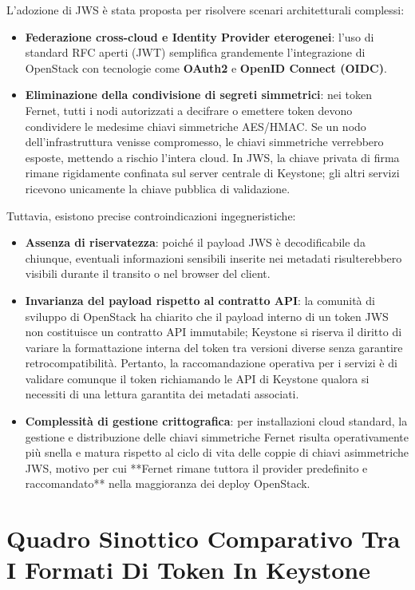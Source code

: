 \documentclass[11pt, a4paper]{article}
\begin{document}
L'adozione di JWS è stata proposta per risolvere scenari architetturali complessi:
\begin{itemize}[noitemsep]
    \item \textbf{Federazione cross-cloud e Identity Provider eterogenei}: l'uso di standard RFC aperti (JWT) semplifica grandemente l'integrazione di OpenStack con tecnologie come \textbf{OAuth2} e \textbf{OpenID Connect (OIDC)}.
    \item \textbf{Eliminazione della condivisione di segreti simmetrici}: nei token Fernet, tutti i nodi autorizzati a decifrare o emettere token devono condividere le medesime chiavi simmetriche AES/HMAC. Se un nodo dell'infrastruttura venisse compromesso, le chiavi simmetriche verrebbero esposte, mettendo a rischio l'intera cloud. In JWS, la chiave privata di firma rimane rigidamente confinata sul server centrale di Keystone; gli altri servizi ricevono unicamente la chiave pubblica di validazione.
\end{itemize}

Tuttavia, esistono precise controindicazioni ingegneristiche:
\begin{itemize}
    \item \textbf{Assenza di riservatezza}: poiché il payload JWS è decodificabile da chiunque, eventuali informazioni sensibili inserite nei metadati risulterebbero visibili durante il transito o nel browser del client.
    \item \textbf{Invarianza del payload rispetto al contratto API}: la comunità di sviluppo di OpenStack ha chiarito che il payload interno di un token JWS non costituisce un contratto API immutabile; Keystone si riserva il diritto di variare la formattazione interna del token tra versioni diverse senza garantire retrocompatibilità. Pertanto, la raccomandazione operativa per i servizi è di validare comunque il token richiamando le API di Keystone qualora si necessiti di una lettura garantita dei metadati associati.
    \item \textbf{Complessità di gestione crittografica}: per installazioni cloud standard, la gestione e distribuzione delle chiavi simmetriche Fernet risulta operativamente più snella e matura rispetto al ciclo di vita delle coppie di chiavi asimmetriche JWS, motivo per cui **Fernet rimane tuttora il provider predefinito e raccomandato** nella maggioranza dei deploy OpenStack.
\end{itemize}

\newpage

\section{Quadro Sinottico Comparativo Tra I Formati Di Token In Keystone}
\end{document}

